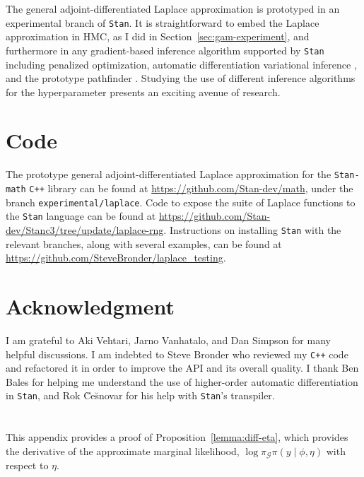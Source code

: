 \documentclass[stslayout, noinfoline]{imsart}
\theoremstyle{definition}
\begin{document}
The general adjoint-differentiated Laplace approximation is prototyped in an experimental branch of \texttt{Stan}.
It is straightforward to embed the Laplace approximation in HMC, as I did in Section~\ref{sec:gam-experiment}, and furthermore in any gradient-based inference algorithm supported by \texttt{Stan}
including penalized optimization, automatic differentiation variational inference \citep{Kucukelbir:2017}, and the prototype pathfinder \citep{Zhang:2021}.
Studying the use of different inference algorithms for the hyperparameter presents an exciting avenue of research.

\section{Code}

The prototype general adjoint-differentiated Laplace approximation for the \texttt{Stan-math} \texttt{C++} library can be found at \url{https://github.com/Stan-dev/math}, under the branch \texttt{experimental/laplace}.
Code to expose the suite of Laplace functions to the \texttt{Stan} language can be found at
\url{https://github.com/Stan-dev/Stanc3/tree/update/laplace-rng}.
Instructions on installing \texttt{Stan} with the relevant branches, along with several examples, can be found at \url{https://github.com/SteveBronder/laplace_testing}.

\section*{Acknowledgment}

I am grateful to Aki Vehtari, Jarno Vanhatalo, and Dan Simpson for many helpful discussions.
I am indebted to Steve Bronder who reviewed my \texttt{C++} code
and refactored it in order to improve the API and its overall quality.
I thank Ben Bales for helping me understand the use of higher-order automatic differentiation in \texttt{Stan},
and Rok \u{C}e\u{s}novar for his help with \texttt{Stan}'s transpiler.





\appendix

\section{}

This appendix provides a proof of Proposition~\ref{lemma:diff-eta}, which provides the derivative of the approximate marginal likelihood, $\log \pi_\mathcal{G} \pi(y \mid \phi, \eta)$ with respect to $\eta$.
\end{document}

